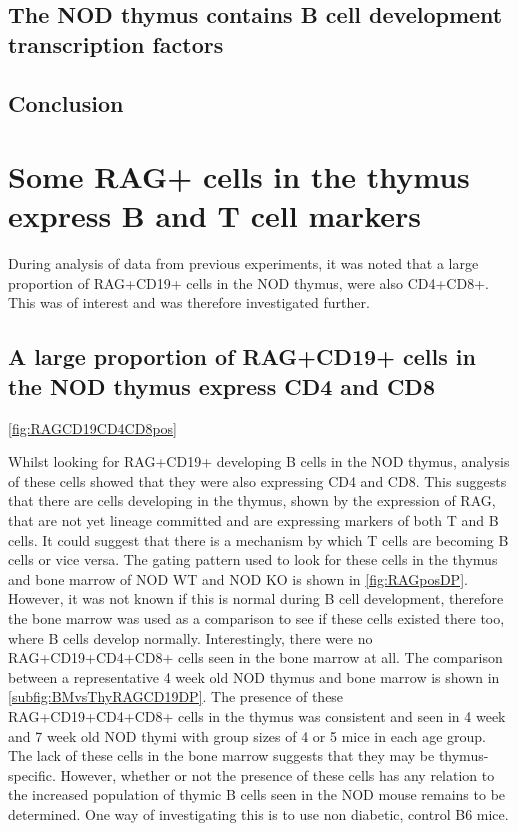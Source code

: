 \subsection{The NOD thymus contains B cell development transcription factors}



\subsection{Conclusion}




\section{Some RAG+ cells in the thymus express B and T cell markers}
During analysis of data from previous experiments, it was noted that a large proportion of RAG+CD19+ cells in the NOD thymus, were also CD4+CD8+.
This was of interest and was therefore investigated further.

\subsection{A large proportion of RAG+CD19+ cells in the NOD thymus express CD4 and CD8}

\cref{fig:RAGCD19CD4CD8pos}

Whilst looking for RAG+CD19+ developing B cells in the NOD thymus, analysis of these cells showed that they were also expressing CD4 and CD8. 
This suggests that there are cells developing in the thymus, shown by the expression of RAG, that are not yet lineage committed and are expressing markers of both T and B cells.
It could suggest that there is a mechanism by which T cells are becoming B cells or vice versa.
The gating pattern used to look for these cells in the thymus and bone marrow of NOD WT and NOD KO is shown in \cref{fig:RAGposDP}.
However, it was not known if this is normal during B cell development, therefore the bone marrow was used as a comparison to see if these cells existed there too, where B cells develop normally.
Interestingly, there were no RAG+CD19+CD4+CD8+ cells seen in the bone marrow at all. 
The comparison between a representative 4 week old NOD thymus and bone marrow is shown in \cref{subfig:BMvsThyRAGCD19DP}.
The presence of these RAG+CD19+CD4+CD8+ cells in the thymus was consistent and seen in 4 week and 7 week old NOD thymi with group sizes of 4 or 5 mice in each age group. 
The lack of these cells in the bone marrow suggests that they may be thymus-specific.
However, whether or not the presence of these cells has any relation to the increased population of thymic B cells seen in the NOD mouse remains to be determined.
One way of investigating this is to use non diabetic, control B6 mice.


